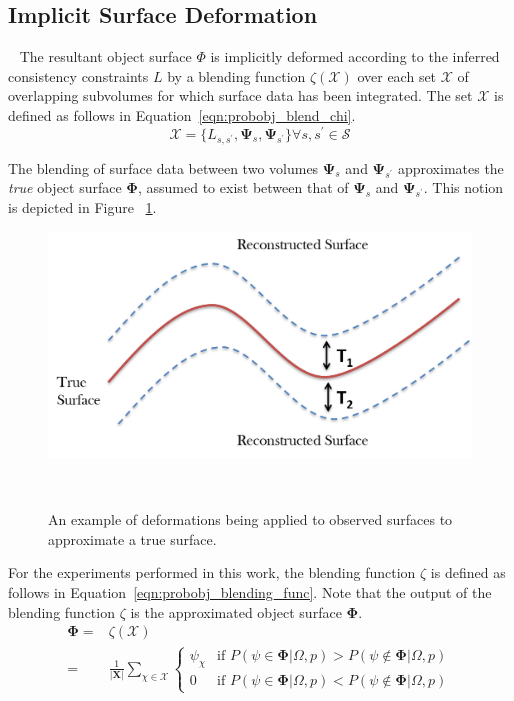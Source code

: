 \subsection{Implicit Surface Deformation}
~\label{subsec:probobj_implicit_surface_deform}
The resultant object surface \( \Phi \) is implicitly deformed according to the 
inferred consistency constraints \( L \) by a blending function \( \zeta(\mathcal{X}) \) 
over each set \( \mathcal{X} \) of overlapping subvolumes for which surface data has been integrated.
The set \( \mathcal{X} \) is defined as follows in Equation~\ref{eqn:probobj_blend_chi}.
\begin{equation}
  \label{eqn:probobj_blend_chi}
  \mathcal{X} = \Big\{ 
    L_{s, s^{'}}, \bm{\Psi}_{s}, \bm{\Psi}_{s^{'}} 
  \Big\}
  \forall s, s^{'} \in \mathcal{S}
\end{equation}

The blending of surface data between two volumes \( \bm{\Psi}_{s} \) and \( \bm{\Psi}_{s^{'}} \) 
approximates the \textit{true} object surface \( \bm{\Phi} \), assumed to exist between that of 
\( \bm{\Psi}_{s} \) and \( \bm{\Psi}_{s^{'}} \). This notion is depicted in Figure
~\ref{figure:probobj_implicit_surface}.
\begin{figure}[!htbp]
  \centering
  \includegraphics[width=.6\linewidth]{figures/object_recon/deformation.png}
  \caption[Implicit Surface Deformation]{An example of deformations being applied to observed surfaces 
  to approximate a true surface.}
~\label{figure:probobj_implicit_surface}
\end{figure}

For the experiments performed in this work, the blending function \( \zeta \) is defined as follows in 
Equation~\ref{eqn:probobj_blending_func}. Note that the output of the blending function \( \zeta \) is 
the approximated object surface \( \bm{\Phi} \).
\begin{align}
  \label{eqn:probobj_blending_func}
  \bm{\Phi} ={}& \zeta(\mathcal{X}) \\
  ={}&
  \frac{1}{\left| \bm{X} \right|} \sum_{\chi \in \mathcal{X}}
  \begin{cases}
    \psi_{\chi} & \text{if $P(\psi \in \mathbf{\Phi} | \Omega, p) > P(\psi \notin \mathbf{\Phi} | \Omega, p)$} \\
    0 & \text{if $P(\psi \in \mathbf{\Phi} | \Omega, p) < P(\psi \notin \mathbf{\Phi} | \Omega, p)$}
  \end{cases}
\end{align}

